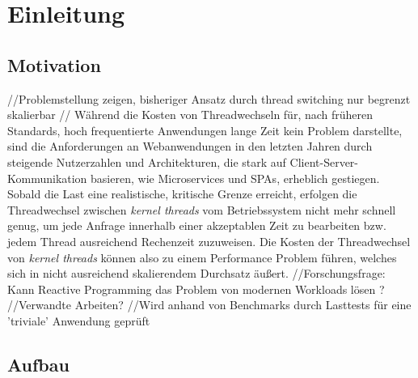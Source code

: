 \section{Einleitung}
\label{sec:einleitung}

\subsection{Motivation}
\label{subsec:motivation}
//Problemstellung zeigen, bisheriger Ansatz durch thread switching nur begrenzt skalierbar
//      Während die Kosten von Threadwechseln für, nach früheren Standards, hoch frequentierte Anwendungen lange Zeit kein Problem darstellte,
    	sind die Anforderungen an Webanwendungen in den letzten Jahren durch steigende Nutzerzahlen und Architekturen,
        die stark auf Client-Server-Kommunikation basieren, wie Microservices und SPAs, erheblich gestiegen.
        \noindent
        Sobald die Last eine realistische, kritische Grenze erreicht, erfolgen die Threadwechsel zwischen \textit{kernel threads} vom Betriebssystem
        nicht mehr schnell genug, um jede Anfrage innerhalb einer akzeptablen Zeit zu bearbeiten bzw. jedem Thread ausreichend Rechenzeit zuzuweisen.
        Die Kosten der Threadwechsel von \textit{kernel threads} können also zu einem Performance Problem führen, welches sich in nicht
        ausreichend skalierendem Durchsatz äußert.
//Forschungsfrage: Kann Reactive Programming das Problem von modernen Workloads lösen ?
//Verwandte Arbeiten?
//Wird anhand  von Benchmarks durch Lasttests für eine 'triviale' Anwendung geprüft
\subsection{Aufbau}
\label{subsec:aufbau}